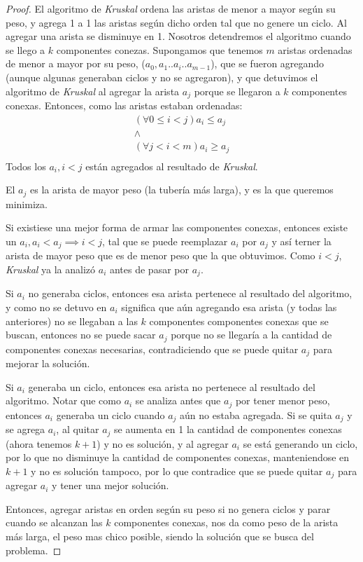 \begin{proof}
	El algoritmo de \emph{Kruskal} ordena las aristas de menor a mayor seg\'un su peso, y agrega 1 a 1 las aristas seg\'un dicho orden tal que no genere un ciclo. Al agregar una arista se disminuye en 1.  Nosotros detendremos el algoritmo cuando se llego a $k$ componentes conezas.
	Supongamos que tenemos $m$ aristas ordenadas de menor a mayor por su peso, ($a_0, a_1 .. a_i .. a_{m-1}$), que se fueron agregando (aunque algunas generaban ciclos y no se agregaron), y que detuvimos el algoritmo de \emph{Kruskal} al agregar la arista $a_j$ porque se llegaron a $k$ componentes conexas. Entonces, como las aristas estaban ordenadas:
	\begin{equation*}
	\begin{split}
		(\forall 0 \leq i < j) a_i \leq a_j \\
		\land \\
		(\forall j < i < m) a_i \geq a_j \\
	\end{split}
	\end{equation*}
	Todos los $a_i, i < j$ est\'an agregados al resultado de \emph{Kruskal}.

	El $a_j$ es la arista de mayor peso (la tuber\'ia m\'as larga), y es la que queremos minimiza.

	Si existiese una mejor forma de armar las componentes conexas, entonces existe un $a_i, a_i < a_j \implies i < j$, tal que se puede reemplazar $a_i$ por $a_j$ y as\'i terner la arista de mayor peso que es de menor peso que la que obtuvimos. Como $i < j$, \emph{Kruskal} ya la analiz\'o $a_i$ antes de pasar por $a_j$.

	Si $a_i$ no generaba ciclos, entonces esa arista pertenece al resultado del algoritmo, y como no se detuvo en $a_i$ significa que a\'un agregando esa arista (y todas las anteriores) no se llegaban a las $k$ componentes componentes conexas que se buscan, entonces no se puede sacar $a_j$ porque no se llegar\'ia a la cantidad de componentes conexas necesarias, contradiciendo que se puede quitar $a_j$ para mejorar la soluci\'on.

	Si $a_i$ generaba un ciclo, entonces esa arista no pertenece al resultado del algoritmo. Notar que como $a_i$ se analiza antes que $a_j$ por tener menor peso, entonces $a_i$ generaba un ciclo cuando $a_j$ a\'un no estaba agregada. Si se quita $a_j$ y se agrega $a_i$, al quitar $a_j$ se aumenta en 1 la cantidad de componentes conexas (ahora tenemos $k + 1$) y no es soluci\'on, y al agregar $a_i$ se est\'a generando un ciclo, por lo que no disminuye la cantidad de componentes conexas, manteniendose en $k + 1$ y no es soluci\'on tampoco, por lo que contradice que se puede quitar $a_j$ para agregar $a_i$ y tener una mejor soluci\'on.

	Entonces, agregar aristas en orden seg\'un su peso si no genera ciclos y parar cuando se alcanzan las $k$ componentes conexas, nos da como peso de la arista m\'as larga, el peso mas chico posible, siendo la soluci\'on que se busca del problema.

\end{proof}

